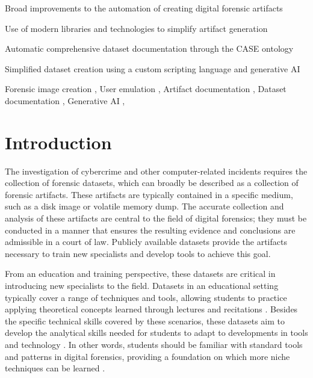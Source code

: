 \documentclass[preprint,12pt]{elsarticle}
\begin{document}
\begin{frontmatter}

\begin{highlights}
\item Broad improvements to the automation of creating digital forensic artifacts
\item Use of modern libraries and technologies to simplify artifact generation
\item Automatic comprehensive dataset documentation through the CASE ontology
\item Simplified dataset creation using a custom scripting language and generative AI
\end{highlights}
    
\begin{keyword}
Forensic image creation \sep
User emulation \sep
Artifact documentation \sep
Dataset documentation \sep
Generative AI \sep
\end{keyword}

\end{frontmatter}

\section{Introduction}\label{introduction}

The investigation of cybercrime and other computer-related incidents
requires the collection of forensic datasets, which can broadly be
described as a collection of forensic artifacts. These artifacts are
typically contained in a specific medium, such as a disk image or
volatile memory dump. The accurate collection and analysis of these
artifacts are central to the field of digital forensics; they must be
conducted in a manner that ensures the resulting evidence and
conclusions are admissible in a court of law. Publicly available
datasets provide the artifacts necessary to train new specialists and
develop tools to achieve this goal.

From an education and training perspective, these datasets are critical
in introducing new specialists to the field. Datasets in an educational
setting typically cover a range of techniques and tools, allowing
students to practice applying theoretical concepts learned through
lectures and recitations
\citep{adelsteinAutomaticallyCreatingRealistic2005}. Besides the
specific technical skills covered by these scenarios, these datasets aim
to develop the analytical skills needed for students to adapt to
developments in tools and technology
\citep{cooperStandardsDigitalForensics2010}. In other words, students
should be familiar with standard tools and patterns in digital
forensics, providing a foundation on which more niche techniques can be
learned \citep{lawrenceFrameworkDesignWebbased2009}.
\end{document}
